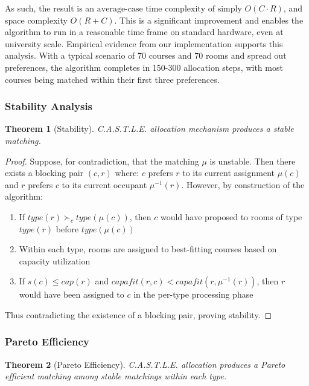 \documentclass[a4paper, oneside]{article}
\theoremstyle{plain}
\newtheorem{theorem}{Theorem}
\newcommand{\castle}{C{\small.}A{\small.}S{\small.}T{\small.}L{\small.}E{\small.}}
\begin{document}
As such, the result is an $\boxed{\text{average-case time complexity of simply } O(C \cdot R)}$, and space complexity $O(R + C)$. This is a significant improvement and
enables the algorithm to run in a reasonable time frame on standard hardware, even at university scale.
Empirical evidence from our implementation supports this analysis. With a typical scenario of 70 courses and 70 rooms and spread out preferences, the algorithm completes in 150-300 allocation steps,
with most courses being matched within their first three preferences.

\subsubsection{Stability Analysis}
\begin{theorem}[Stability]
	\castle{} allocation mechanism produces a stable matching.
\end{theorem}

\begin{proof}
	Suppose, for contradiction, that the matching $\mu$ is unstable. Then there exists a blocking pair $(c, r)$ where:
	$c$ prefers $r$ to its current assignment $\mu(c)$ and $r$ prefers $c$ to its current occupant $\mu^{-1}(r)$.
	However, by construction of the algorithm:
	\begin{enumerate}
		\item If $type(r) \succ_c type(\mu(c))$, then $c$ would have proposed to rooms of type $type(r)$ before $type(\mu(c))$
		\item Within each type, rooms are assigned to best-fitting courses based on capacity utilization
		\item If $s(c) \leq cap(r)$ and $capafit(r,c) < capafit(r,\mu^{-1}(r))$, then $r$ would have been assigned to $c$ in the per-type processing phase
	\end{enumerate}
	Thus contradicting the existence of a blocking pair, proving stability.
\end{proof}

\subsubsection{Pareto Efficiency}
\begin{theorem}[Pareto Efficiency]
	\castle{} allocation produces a Pareto efficient matching among stable matchings within each type.
\end{theorem}
\end{document}
